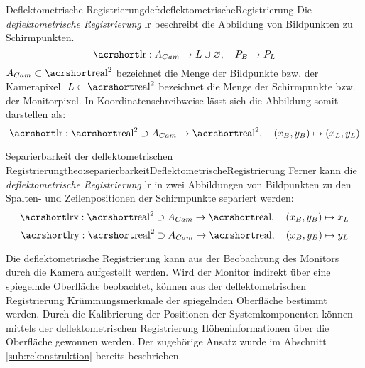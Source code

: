\begin{Definition}{Deflektometrische Registrierung}{def:deflektometrischeRegistrierung}
	Die \textit{deflektometrische Registrierung} \acrshort{lr} beschreibt die Abbildung von Bildpunkten zu Schirmpunkten. \cite{kit_werling}
	\begin{equation*}
		\acrshortmath{lr} : A_{Cam} \rightarrow L \cup \varnothing ,\quad P_{B} \rightarrow P_{L}
	\end{equation*}
	$ A_{Cam} \subset \acrshortmath{real}^{2} $ bezeichnet die Menge der Bildpunkte bzw. der Kamerapixel.
	$ L \subset \acrshortmath{real}^{2} $ bezeichnet die Menge der Schirmpunkte bzw. der Monitorpixel.
	In Koordinatenschreibweise lässt sich die Abbildung somit darstellen als:
	\begin{equation*}\label{eq:deflektometrischeRegistrierungAbbildung}
		\acrshortmath{lr} : \acrshortmath{real}^{2} \supset A_{Cam} \rightarrow \acrshortmath{real}^2 ,\quad (x_{B}, y_{B}) \mapsto (x_{L}, y_{L})
	\end{equation*}
\end{Definition}

\begin{Satz}{Separierbarkeit der deflektometrischen Registrierung}{theo:separierbarkeitDeflektometrischeRegistrierung}
Ferner kann die \textit{deflektometrische Registrierung} \acrshort{lr} in zwei Abbildungen von Bildpunkten zu den Spalten- und Zeilenpositionen der Schirmpunkte separiert werden:
	\begin{equation*}
		\acrshortmath{lrx} : \acrshortmath{real}^{2} \supset A_{Cam} \rightarrow \acrshortmath{real} ,\quad (x_{B}, y_{B}) \mapsto x_{L}
	\end{equation*}
	\begin{equation*}
		\acrshortmath{lry} : \acrshortmath{real}^{2} \supset A_{Cam} \rightarrow \acrshortmath{real} ,\quad (x_{B}, y_{B}) \mapsto y_{L}
	\end{equation*}
\end{Satz}

\noindent
Die deflektometrische Registrierung kann aus der Beobachtung des Monitors durch die Kamera aufgestellt werden.
Wird der Monitor indirekt über eine spiegelnde Oberfläche beobachtet, können aus der deflektometrischen Registrierung Krümmungsmerkmale der spiegelnden Oberfläche bestimmt werden.
Durch die Kalibrierung der Positionen der Systemkomponenten können mittels der deflektometrischen Registrierung Höheninformationen über die Oberfläche gewonnen werden.
Der zugehörige Ansatz wurde im Abschnitt \ref{sub:rekonstruktion} bereits beschrieben.

